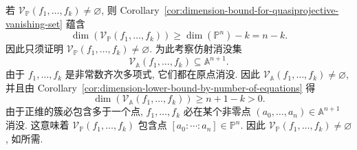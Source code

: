 \begingroup
\renewcommand{\AJProofBegin}{%
  \par\addvspace{\topsep}\noindent
  {\sffamily\bfseries\CJKfamily{pffont}Proof of Proposition~\ref{prop:dimension-of-homogeneous-systems}}\enspace\ignorespaces
}
\begin{Proof}
若 $\mathcal{V}_{\mathbb{P}}(f_{1},\ldots,f_{k})\ne\varnothing$, 则 Corollary~\ref{cor:dimension-bound-for-quasiprojective-vanishing-set} 蕴含
\[
  \dim(\mathcal{V}_{\mathbb{P}}(f_{1},\ldots,f_{k}))\ge\dim(\mathbb{P}^{n})-k=n-k.
\]
因此只须证明 $\mathcal{V}_{\mathbb{P}}(f_{1},\ldots,f_{k})\ne\varnothing$. 为此考察仿射消没集
\[
  \mathcal{V}_{\mathbb{A}}(f_{1},\ldots,f_{k})\subseteq\mathbb{A}^{n+1}.
\]
由于 $f_{1},\ldots,f_{k}$ 是非常数齐次多项式, 它们都在原点消没. 因此 $\mathcal{V}_{\mathbb{A}}(f_{1},\ldots,f_{k})\ne\varnothing$, 并且由 Corollary~\ref{cor:dimension-lower-bound-by-number-of-equations} 得
\[
  \dim(\mathcal{V}_{\mathbb{A}}(f_{1},\ldots,f_{k}))\ge n+1-k>0.
\]
由于正维的簇必包含多于一个点, $f_{1},\ldots,f_{k}$ 必在某个非零点 $(a_{0},\ldots,a_{n})\in\mathbb{A}^{n+1}$ 消没. 这意味着 $\mathcal{V}_{\mathbb{P}}(f_{1},\ldots,f_{k})$ 包含点 $[a_{0}:\cdots:a_{n}]\in\mathbb{P}^{n}$. 因此 $\mathcal{V}_{\mathbb{P}}(f_{1},\ldots,f_{k})\ne\varnothing$, 如所需.
\end{Proof}
\endgroup

